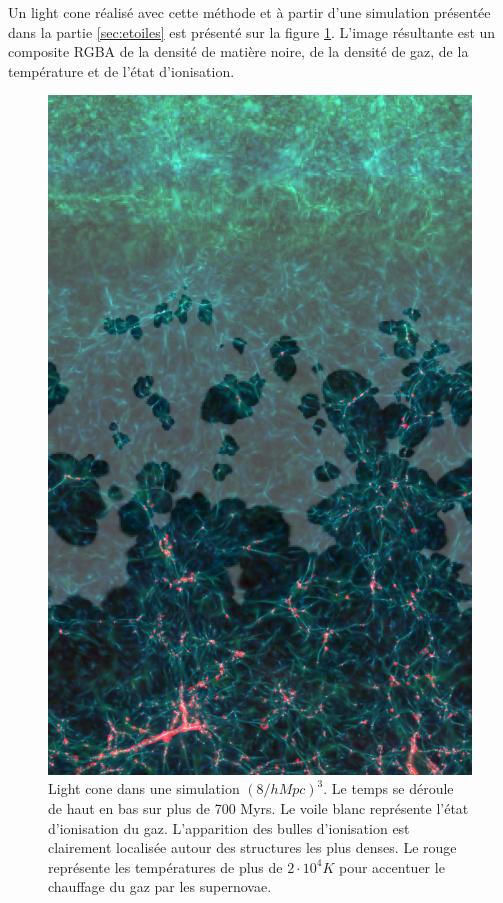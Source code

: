 Un light cone réalisé avec cette méthode et à partir d'une simulation présentée dans la partie \ref{sec:etoiles} est présenté sur la figure \ref{fig:lightcone}.
L'image résultante est un composite RGBA de la densité de matière noire, de la densité de gaz, de la température et de l'état d'ionisation.

\begin{figure}
        \includegraphics[height=.90\textheight]{img/04/frise_wall.png} 
        \caption[Light cone]{Light cone dans une simulation $(8/h Mpc)^3$. 
        Le temps se déroule de haut en bas sur plus de 700 Myrs.
        Le voile blanc représente l'état d'ionisation du gaz.
        L'apparition des bulles d'ionisation est clairement localisée autour des structures les plus denses.
        Le rouge représente les températures de plus de $2\cdot 10^4K$ pour accentuer le chauffage du gaz par les supernovae. 
 }
 		\label{fig:lightcone}
\end{figure}





